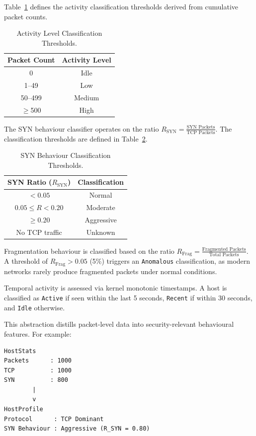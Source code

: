 \documentclass[conference]{IEEEtran}
\begin{document}
Table~\ref{tab:activity} defines the activity classification thresholds derived from cumulative packet counts.

\begin{table}[h]
\centering
\caption{Activity Level Classification Thresholds.}
\label{tab:activity}
\begin{tabular}{cc}
\toprule
Packet Count & Activity Level \\
\midrule
0 & Idle \\
1--49 & Low \\
50--499 & Medium \\
$\geq$500 & High \\
\bottomrule
\end{tabular}
\end{table}

The SYN behaviour classifier operates on the ratio $R_{\text{SYN}} = \frac{\text{SYN Packets}}{\text{TCP Packets}}$. The classification thresholds are defined in Table~\ref{tab:syn_thresholds}.

\begin{table}[h]
\centering
\caption{SYN Behaviour Classification Thresholds.}
\label{tab:syn_thresholds}
\begin{tabular}{cc}
\toprule
SYN Ratio ($R_{\text{SYN}}$) & Classification \\
\midrule
$< 0.05$ & Normal \\
$0.05 \leq R < 0.20$ & Moderate \\
$\geq 0.20$ & Aggressive \\
No TCP traffic & Unknown \\
\bottomrule
\end{tabular}
\end{table}

Fragmentation behaviour is classified based on the ratio $R_{\text{Frag}} = \frac{\text{Fragmented Packets}}{\text{Total Packets}}$. A threshold of $R_{\text{Frag}} > 0.05$ (5\%) triggers an \texttt{Anomalous} classification, as modern networks rarely produce fragmented packets under normal conditions.

Temporal activity is assessed via kernel monotonic timestamps. A host is classified as \texttt{Active} if seen within the last 5 seconds, \texttt{Recent} if within 30 seconds, and \texttt{Idle} otherwise.

This abstraction distills packet-level data into security-relevant behavioural features. For example:

\begin{verbatim}
HostStats
Packets      : 1000
TCP          : 1000
SYN          : 800
        |
        v
HostProfile
Protocol      : TCP Dominant
SYN Behaviour : Aggressive (R_SYN = 0.80)
\end{verbatim}
\end{document}
